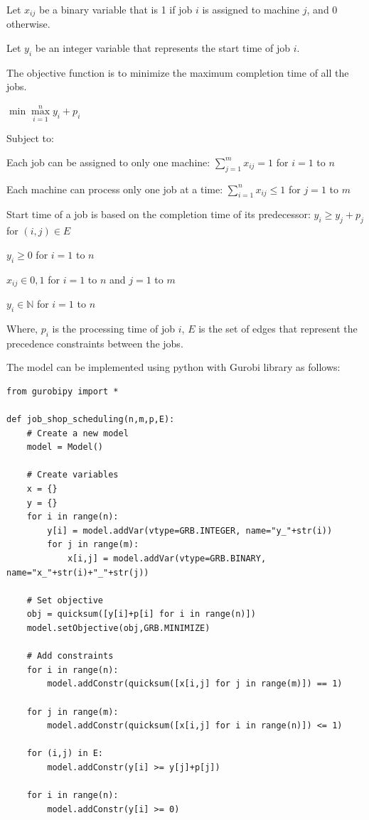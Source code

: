 {Let $x_{ij}$ be a binary variable that is 1 if job $i$ is assigned to machine $j$, and 0 otherwise.

Let $y_i$ be an integer variable that represents the start time of job $i$.

The objective function is to minimize the maximum completion time of all the jobs.

$\min \max\limits_{i=1}^{n} y_i + p_i$

Subject to:

Each job can be assigned to only one machine: $\sum\limits_{j=1}^{m} x_{ij} = 1$ for $i=1$ to $n$

Each machine can process only one job at a time: $\sum\limits_{i=1}^{n} x_{ij} \leq 1$ for $j=1$ to $m$

Start time of a job is based on the completion time of its predecessor: $y_i \geq y_j + p_j$ for $(i,j) \in E$

$y_i \geq 0$ for $i=1$ to $n$

$x_{ij} \in {0,1}$ for $i=1$ to $n$ and $j=1$ to $m$

$y_i \in \mathbb{N}$ for $i=1$ to $n$

Where, $p_i$ is the processing time of job $i$, $E$ is the set of edges that represent the precedence constraints between the jobs.

The model can be implemented using python with Gurobi library as follows:

\begin{verbatim}
from gurobipy import *

def job_shop_scheduling(n,m,p,E):
    # Create a new model
    model = Model()

    # Create variables
    x = {}
    y = {}
    for i in range(n):
        y[i] = model.addVar(vtype=GRB.INTEGER, name="y_"+str(i))
        for j in range(m):
            x[i,j] = model.addVar(vtype=GRB.BINARY, name="x_"+str(i)+"_"+str(j))

    # Set objective
    obj = quicksum([y[i]+p[i] for i in range(n)])
    model.setObjective(obj,GRB.MINIMIZE)

    # Add constraints
    for i in range(n):
        model.addConstr(quicksum([x[i,j] for j in range(m)]) == 1)

    for j in range(m):
        model.addConstr(quicksum([x[i,j] for i in range(n)]) <= 1)

    for (i,j) in E:
        model.addConstr(y[i] >= y[j]+p[j])

    for i in range(n):
        model.addConstr(y[i] >= 0)


\end{verbatim}}
